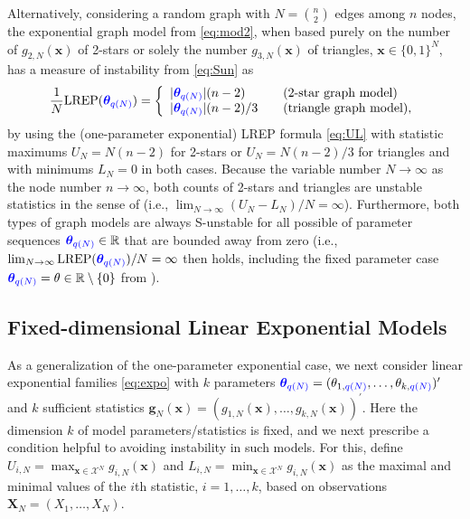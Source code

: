\documentclass[numbib]{imamat}
\theoremstyle{theorem}
\theoremstyle{lemma}
\theoremstyle{example}
\theoremstyle{corollary}
\theoremstyle{definition}
\theoremstyle{remark}
\theoremstyle{approximation}
\theoremstyle{scheme}
\newcommand{\REP}{\mathrm{LREP}}
\newcommand{\thetaidx}{q(N)}
\newcommand{\thetaN}{\boldsymbol \theta_{\thetaidx}}
\newcommand{\ak}[1]{{\color{blue} #1}}
\begin{document}
Alternatively, considering a random graph with \(N={n \choose 2}\) edges among \(n\) nodes, the exponential graph model from \eqref{eq:mod2}, when based purely on the number of \(g_{2,N}(\boldsymbol x)\) of 2-stars or solely the number \(g_{3,N}(\boldsymbol x)\) of triangles, \(\boldsymbol x\in\{0,1\}^N\), has a measure of instability from \eqref{eq:Sun} as
\[
\frac{1}{N}\REP(\ak{\thetaN} )  = \left\{ \begin{array}{lcl} |\ak{\thetaN}| (n-2) && \text{(2-star graph model)}\\
|\ak{\thetaN}|(n-2)/3 &&\text{(triangle graph model)},\end{array}\right.
\]
by using the (one-parameter exponential) LREP formula \eqref{eq:UL} with statistic maximums \(U_N= N(n-2)\) for 2-stars or \(U_N= N(n-2)/3\) for triangles and with minimums \(L_N=0\) in both cases. Because the variable number \(N\to \infty\) as the node number \(n\to \infty\), both counts of 2-stars and triangles are unstable statistics in the sense of \citet{schweinberger2011instability} (i.e., \(\lim_{N\to \infty} (U_N-L_N)/N=\infty\)). Furthermore, both types of graph models are always S-unstable for all possible of parameter sequences \(\ak{\thetaN} \in\mathbb{R}\) that are bounded away from zero (i.e., \(\lim_{N\to \infty}\REP(\ak{\thetaN} )/N=\infty\) then holds, including the fixed parameter case \(\ak{\thetaN}=\theta\in\mathbb{R}\setminus \{0\}\) from \citet{schweinberger2011instability}).

\hypertarget{fixed-dim-exp}{%
\subsection{Fixed-dimensional Linear Exponential Models}\label{fixed-dim-exp}}

As a generalization of the one-parameter exponential case, we next consider linear exponential families \eqref{eq:expo} with \(k\) parameters \(\ak{\thetaN} = (\theta_{1,\ak{\thetaidx}},\ldots,\theta_{k,\ak{\thetaidx}})^\prime\) and \(k\) sufficient statistics \(\boldsymbol g_N(\boldsymbol x) = (g_{1,N}(\boldsymbol x),\ldots, g_{k,N}(\boldsymbol x))^\prime\). Here the dimension \(k\) of model parameters/statistics is fixed, and we next prescribe a condition helpful to avoiding instability in such models. For this, define \(U_{i,N}=\max_{\boldsymbol x \in\mathcal{X}^N} g_{i,N}(\boldsymbol x)\) and \(L_{i,N}=\min_{\boldsymbol x \in\mathcal{X}^N} g_{i,N}(\boldsymbol x)\) as the maximal and minimal values of the \(i\)th statistic, \(i=1,\ldots,k\), based on observations \(\boldsymbol X_N=(X_1,\ldots,X_N)\).
\end{document}
